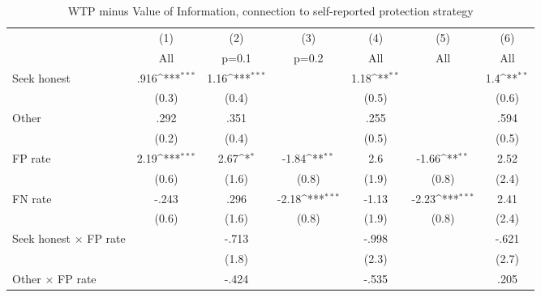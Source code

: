 \begin{table}[H]\centering
\def\sym#1{\ifmmode^{#1}\else\(^{#1}\)\fi}
\caption{WTP minus Value of Information, connection to self-reported protection strategy}
\begin{tabular}{l*{6}{c}}
\hline\hline
                &\multicolumn{1}{c}{(1)}&\multicolumn{1}{c}{(2)}&\multicolumn{1}{c}{(3)}&\multicolumn{1}{c}{(4)}&\multicolumn{1}{c}{(5)}&\multicolumn{1}{c}{(6)}\\
                &\multicolumn{1}{c}{All}&\multicolumn{1}{c}{p=0.1}&\multicolumn{1}{c}{p=0.2}&\multicolumn{1}{c}{All}&\multicolumn{1}{c}{All}&\multicolumn{1}{c}{All}\\
\hline
Seek honest     &     .916\sym{***}&     1.16\sym{***}&                  &     1.18\sym{**} &                  &      1.4\sym{**} \\
                &    (0.3)         &    (0.4)         &                  &    (0.5)         &                  &    (0.6)         \\
Other           &     .292         &     .351         &                  &     .255         &                  &     .594         \\
                &    (0.2)         &    (0.4)         &                  &    (0.5)         &                  &    (0.5)         \\
FP rate         &     2.19\sym{***}&     2.67\sym{*}  &    -1.84\sym{**} &      2.6         &    -1.66\sym{**} &     2.52         \\
                &    (0.6)         &    (1.6)         &    (0.8)         &    (1.9)         &    (0.8)         &    (2.4)         \\
FN rate         &    -.243         &     .296         &    -2.18\sym{***}&    -1.13         &    -2.23\sym{***}&     2.41         \\
                &    (0.6)         &    (1.6)         &    (0.8)         &    (1.9)         &    (0.8)         &    (2.4)         \\
Seek honest $\times$ FP rate&                  &    -.713         &                  &    -.998         &                  &    -.621         \\
                &                  &    (1.8)         &                  &    (2.3)         &                  &    (2.7)         \\
Other $\times$ FP rate&                  &    -.424         &                  &    -.535         &                  &     .205         \\

\end{tabular}
\end{table}
